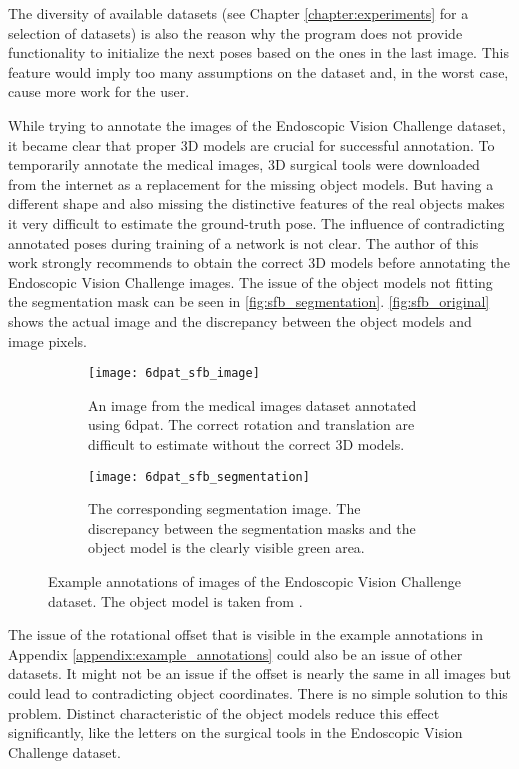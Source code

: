 The diversity of available datasets (see Chapter \ref{chapter:experiments} for a selection of datasets) is also the reason why the program does not provide functionality to initialize the next poses based on the ones in the last image. This feature would imply too many assumptions on the dataset and, in the worst case, cause more work for the user. 

While trying to annotate the images of the Endoscopic Vision Challenge dataset, it became clear that proper 3D models are crucial for successful annotation. To temporarily annotate the medical images, 3D surgical tools were downloaded from the internet as a replacement for the missing object models. But having a different shape and also missing the distinctive features of the real objects makes it very difficult to estimate the ground-truth pose. The influence of contradicting annotated poses during training of a network is not clear. The author of this work strongly recommends to obtain the correct 3D models before annotating the Endoscopic Vision Challenge images. The issue of the object models not fitting the segmentation mask can be seen in \fig \ref{fig:sfb_segmentation}. \fig \ref{fig:sfb_original} shows the actual image and the discrepancy between the object models and image pixels.

\begin{figure}
	\begin{subfigure}[t]{0.47\textwidth}
		\centering
    	\texttt{[image: 6dpat\_sfb\_image]}
    	\caption{An image from the medical images dataset annotated using \ac{6dpat}. The correct rotation and translation are difficult to estimate without the correct 3D models.}
    	\label{fig:6dpat_sfb_image}
	\end{subfigure} 
	\hfill
	\begin{subfigure}[t]{0.47\textwidth}
		\centering
    	\texttt{[image: 6dpat\_sfb\_segmentation]}
    	\caption{The corresponding segmentation image. The discrepancy between the segmentation masks and the object model is the clearly visible green area.}
    	\label{fig:6dpat_sfb_segmentation}
	\end{subfigure} 
	\caption{Example annotations of images of the Endoscopic Vision Challenge dataset. The object model is taken from \cite{3d_scalpel_online}.}
	\label{fig:6dpat_sfb}
\end{figure} 

The issue of the rotational offset that is visible in the example annotations in Appendix \ref{appendix:example_annotations} could also be an issue of other datasets. It might not be an issue if the offset is nearly the same in all images but could lead to contradicting object coordinates. There is no simple solution to this problem. Distinct characteristic of the object models reduce this effect significantly, like the letters on the surgical tools in the Endoscopic Vision Challenge dataset.

